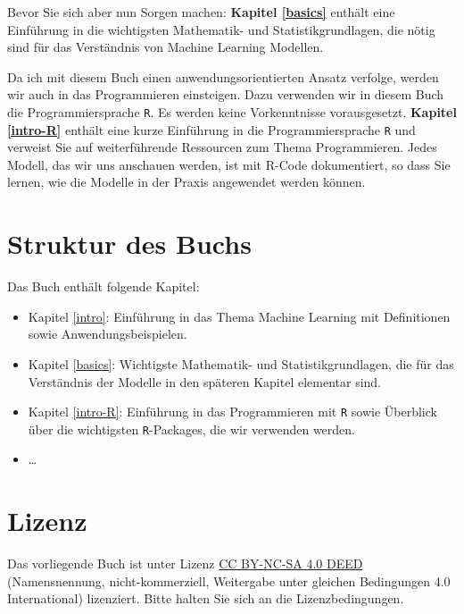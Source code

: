 \documentclass[
]{book}
\providecommand{\tightlist}{%
  \setlength{\itemsep}{0pt}\setlength{\parskip}{0pt}}
\begin{document}
Bevor Sie sich aber nun Sorgen machen: \textbf{Kapitel \ref{basics}} enthält eine Einführung in die wichtigsten Mathematik- und Statistikgrundlagen, die nötig sind für das Verständnis von Machine Learning Modellen.

Da ich mit diesem Buch einen anwendungsorientierten Ansatz verfolge, werden wir auch in das Programmieren einsteigen. Dazu verwenden wir in diesem Buch die Programmiersprache \texttt{R}. Es werden keine Vorkenntnisse vorausgesetzt. \textbf{Kapitel \ref{intro-R}} enthält eine kurze Einführung in die Programmiersprache \texttt{R} und verweist Sie auf weiterführende Ressourcen zum Thema Programmieren. Jedes Modell, das wir uns anschauen werden, ist mit R-Code dokumentiert, so dass Sie lernen, wie die Modelle in der Praxis angewendet werden können.

\hypertarget{struktur-des-buchs}{%
\section*{Struktur des Buchs}\label{struktur-des-buchs}}

Das Buch enthält folgende Kapitel:

\begin{itemize}
\tightlist
\item
  Kapitel \ref{intro}: Einführung in das Thema Machine Learning mit Definitionen sowie Anwendungsbeispielen.
\item
  Kapitel \ref{basics}: Wichtigste Mathematik- und Statistikgrundlagen, die für das Verständnis der Modelle in den späteren Kapitel elementar sind.
\item
  Kapitel \ref{intro-R}: Einführung in das Programmieren mit \texttt{R} sowie Überblick über die wichtigsten \texttt{R}-Packages, die wir verwenden werden.
\item
  \ldots{}
\end{itemize}

\hypertarget{lizenz}{%
\section*{Lizenz}\label{lizenz}}

Das vorliegende Buch ist unter Lizenz \href{https://creativecommons.org/licenses/by-nc-sa/4.0/deed.de}{CC BY-NC-SA 4.0 DEED} (Namensnennung, nicht-kommerziell, Weitergabe unter gleichen Bedingungen 4.0 International) lizenziert. Bitte halten Sie sich an die Lizenzbedingungen.
\end{document}
